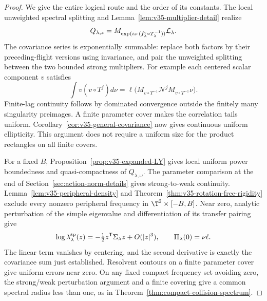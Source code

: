 \begin{proof}
We give the entire logical route and the order of its constants.
The local unweighted spectral splitting and
Lemma~\ref{lem:v35-multiplier-detail} realize
\[
 Q_{\lambda,z}=M_{\exp(i z\cdot(f^{\rm c}_\lambda\circ T_\lambda^{-1}))}
                                      \mathcal L_\lambda.
\]
The covariance series is exponentially summable: replace both factors
by their preceding-flight versions using invariance, and pair the
unweighted splitting between the two bounded strong multipliers.
For example each centered scalar component $v$ satisfies
\[
 \int v(v\circ T^j)d\nu
 =\ell\bigl(M_{v\circ T^{-1}}\mathcal N^j
                         M_{v\circ T^{-1}}\nu\bigr).
\]
Finite-lag continuity follows by dominated convergence outside the
finitely many singularity preimages. A finite parameter cover makes
the correlation tails uniform. Corollary~\ref{cor:v35-general-covariance}
now gives continuous uniform ellipticity. This argument does not
require a uniform size for the product rectangles on all finite covers.

For a fixed $B$, Proposition~\ref{prop:v35-expanded-LY} gives local
uniform power boundedness and quasi-compactness of $Q_{\lambda,\omega}$.
The parameter comparison at the end of
Section~\ref{sec:action-norm-details} gives strong-to-weak continuity.
Lemma~\ref{lem:v35-peripheral-density} and
Theorem~\ref{thm:v35-rotation-free-rigidity} exclude every nonzero
peripheral frequency in $\T^2\times[-B,B]$. Near zero, analytic
perturbation of the simple eigenvalue and differentiation of its
transfer pairing give
\begin{equation}\label{eq:v35-family-eigenvalue}
 \log\lambda^{\rm sp}_\lambda(z)
       =-\tfrac12z^{\mathsf T}\Sigma_\lambda z+O(|z|^3),
                  \qquad \Pi_\lambda(0)=\nu\ell.
\end{equation}
The linear term vanishes by centering, and the second derivative is
exactly the covariance sum just established. Resolvent contours on
a finite parameter cover give uniform errors near zero. On any fixed
compact frequency set avoiding zero, the strong/weak perturbation
argument and a finite covering give a common spectral radius less
than one, as in Theorem~\ref{thm:compact-collision-spectrum}.


\end{proof}
